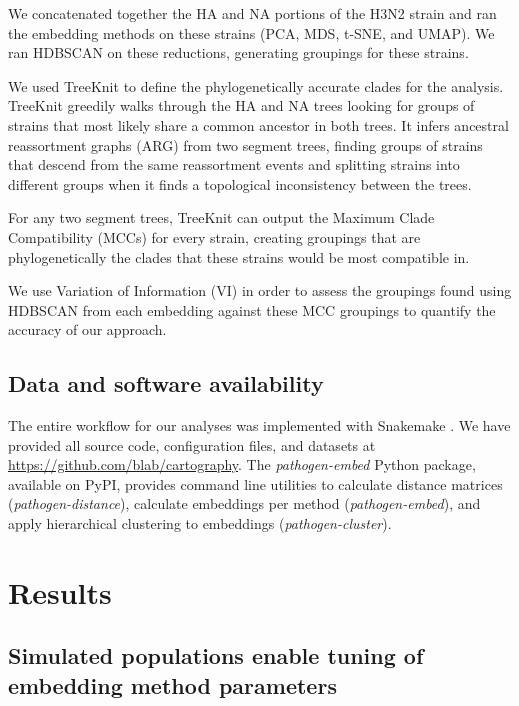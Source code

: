 \documentclass[10pt,letterpaper]{article}
\begin{document}
We concatenated together the HA and NA portions of the H3N2 strain and ran the embedding methods on these strains (PCA, MDS, t-SNE, and UMAP).
We ran HDBSCAN \cite{campello2015hierarchical} on these reductions, generating groupings for these strains.

We used TreeKnit \cite{barrat2022treeknit} to define the phylogenetically accurate clades for the analysis.
TreeKnit greedily walks through the HA and NA trees looking for groups of strains that most likely share a common ancestor in both trees.
It infers ancestral reassortment graphs (ARG) from two segment trees, finding groups of strains that descend from the same reassortment events and splitting strains into different groups when it finds a topological inconsistency between the trees.

For any two segment trees, TreeKnit can output the Maximum Clade Compatibility (MCCs) for every strain, creating groupings that are phylogenetically the clades that these strains would be most compatible in.

We use Variation of Information (VI) in order to assess the groupings found using HDBSCAN from each embedding against these MCC groupings to quantify the accuracy of our approach.

\subsection*{Data and software availability}

The entire workflow for our analyses was implemented with Snakemake \cite{molder_2021}.
We have provided all source code, configuration files, and datasets at \href{https://github.com/blab/cartography}{https://github.com/blab/cartography}.
The \textit{pathogen-embed} Python package, available on PyPI, provides command line utilities to calculate distance matrices (\textit{pathogen-distance}), calculate embeddings per method (\textit{pathogen-embed}), and apply hierarchical clustering to embeddings (\textit{pathogen-cluster}).

\section*{Results}

\subsection*{Simulated populations enable tuning of embedding method parameters}
\end{document}
